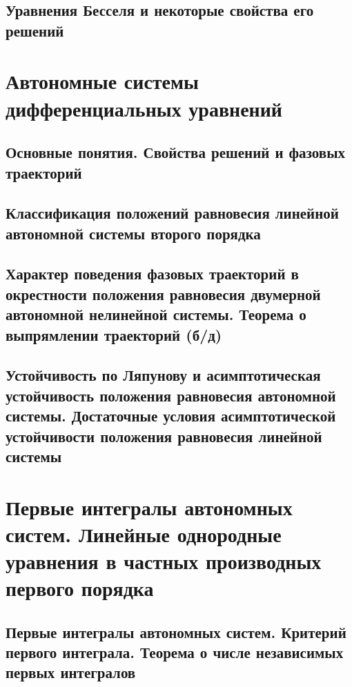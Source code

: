 \subsection{Уравнения Бесселя и некоторые свойства его решений}


\section{Автономные системы дифференциальных уравнений}

\subsection{Основные понятия. Свойства решений и фазовых траекторий}

\newpage

\subsection{Классификация положений равновесия линейной автономной системы второго порядка}

\newpage

\subsection{Характер поведения фазовых траекторий в окрестности положения равновесия двумерной автономной нелинейной системы. Теорема о выпрямлении траекторий (б/д)}
\label{autonom-stratify}

\newpage

\subsection{Устойчивость по Ляпунову и асимптотическая устойчивость положения равновесия автономной системы. Достаточные условия асимптотической устойчивости положения равновесия линейной системы}


\newpage
\section{Первые интегралы автономных систем. Линейные однородные уравнения в частных производных первого порядка}

\subsection{Первые интегралы автономных систем. Критерий первого интеграла. Теорема о числе независимых первых интегралов}

\newpage

